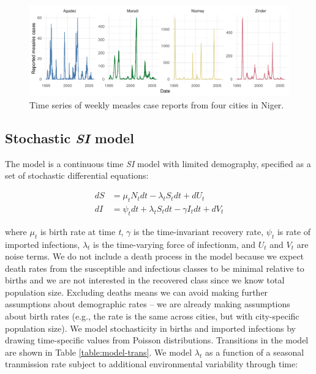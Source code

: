 \documentclass[11pt,]{article}
\begin{document}
\begin{figure}[!ht]
\centering
\includegraphics[width=\textwidth]{../figures/data-timeseries.pdf}
\caption{Time series of weekly measles case reports from four cities in Niger.}
\label{fig:data}
\end{figure}

\hypertarget{stochastic-si-model}{%
\subsection{\texorpdfstring{Stochastic \emph{SI}
model}{Stochastic SI model}}\label{stochastic-si-model}}

The model is a continuous time \emph{SI} model with limited demography,
specified as a set of stochastic differential equations:

\begin{align}
dS &= \mu_t N_t dt - \lambda_t S_t dt + dU_t \\
dI &= \psi_t dt + \lambda_t S_t dt - \gamma I_t dt + dV_t
\end{align}

\noindent{}where \(\mu_t\) is birth rate at time \emph{t}, \(\gamma\) is
the time-invariant recovery rate, \(\psi_t\) is rate of imported
infections, \(\lambda_t\) is the time-varying force of infectionm, and
\(U_t\) and \(V_t\) are noise terms. We do not include a death process
in the model because we expect death rates from the susceptible and
infectious classes to be minimal relative to births and we are not
interested in the recovered class since we know total population size.
Excluding deaths means we can avoid making further assumptions about
demographic rates -- we are already making assumptions about birth rates
(e.g., the rate is the same across cities, but with city-specific
population size). We model stochasticity in births and imported
infections by drawing time-specific values from Poisson distributions.
Transitions in the model are shown in Table \ref{table:model-trans}. We
model \(\lambda_t\) as a function of a seasonal tranmission rate subject
to additional environmental variability through time:
\end{document}
